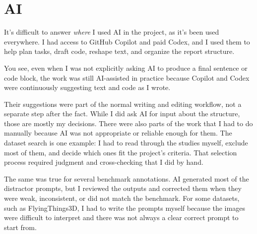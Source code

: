 \section{AI}

It's difficult to answer \textit{where} I used AI in the project, as it's been used everywhere. 
I had access to GitHub Copilot and paid Codex, and I used them to help plan tasks, draft code, reshape text, and
organize the report structure.

You see, even when I was not explicitly asking AI to produce a final sentence or code
block, the work was still AI-assisted in practice because Copilot and Codex
were continuously suggesting text and code as I wrote.  

Their suggestions were part of the normal
writing and editing workflow, not a separate step after the fact.
While I did ask AI for input about the structure, those are mostly my decisions. 
There were also parts of the work that I had to do manually because AI was not
appropriate or reliable enough for them. The dataset search is one example: I
had to read through the studies myself, exclude most of them, and decide which
ones fit the project's criteria. That selection process required judgment and
cross-checking that I did by hand.

The same was true for several benchmark annotations. AI generated most of the
distractor prompts, but I reviewed the outputs and corrected them when they
were weak, inconsistent, or did not match the benchmark. For some datasets,
such as FlyingThings3D, I had to write the prompts myself because the images
were difficult to interpret and there was not always a clear correct prompt to
start from.
